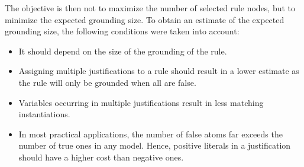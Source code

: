 \documentclass[11pt]{article}
\theoremstyle{plain}
\theoremstyle{definition}
\theoremstyle{example_basic}
\theoremstyle{example_contd}
\theoremstyle{plain}
\begin{document}
The objective is then not to maximize the number of selected rule nodes, but to minimize the expected grounding size. To obtain an estimate of the expected grounding size, the following conditions were taken into account:
\begin{itemize}
  \item It should depend on the size of the grounding of the rule.
  \item Assigning multiple justifications to a rule should result in
  a lower estimate as the rule will only be grounded when all are false.
  \item Variables occurring in multiple justifications result in less matching instantiations.
  \item In most practical applications, the number of false atoms far exceeds the number of true ones in any model. Hence, positive literals in a justification should have a higher cost than negative ones. 
\end{itemize}
\end{document}
